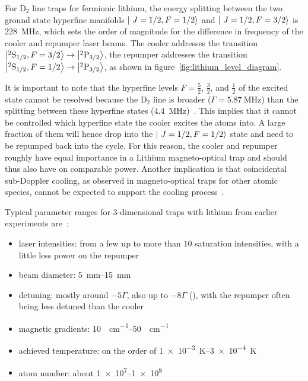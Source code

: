 For D$_2$ line traps for fermionic lithium, the energy splitting between the two ground state hyperfine manifolds $\Ket{~J=1/2, F=1/2}$ and $\Ket{~J=1/2, F=3/2}$ is \SI{228}{\mega\hertz}, which sets the order of magnitude for the difference in frequency of the cooler and repumper laser beams. The cooler addresses the transition $\Ket{^2\text{S}_{1/2}, F = 3/2} \rightarrow \Ket{^2\text{P}_{3/2}}$, the repumper addresses the transition $\Ket{^2\text{S}_{1/2}, F = 1/2} \rightarrow \Ket{^2\text{P}_{3/2}}$, as shown in figure~\ref{fig:lithium_level_diagram}.

It is important to note that the hyperfine levels $F = \frac{5}{2}$, $\frac{3}{2}$, and $\frac{1}{2}$ of the excited state cannot be resolved because the D$_2$ line is broader ($\Gamma = \SI[]{5.87}{\mega\hertz}$) than the splitting between these hyperfine states (\SI[]{4.4}{\mega\hertz})~\cite{gehm_properties_2003}. This implies that it cannot be controlled which hyperfine state the cooler excites the atoms into. A large fraction of them will hence drop into the $\Ket{~J=1/2, F=1/2}$ state and need to be repumped back into the cycle. For this reason, the cooler and repumper roughly have equal importance in a Lithium magneto-optical trap and should thus also have on comparable power. Another implication is that coincidental sub-Doppler cooling, as observed in magneto-optical traps for other atomic species, cannot be expected to support the cooling process~\cite{grier_lambda-enhanced_2013}.

Typical parameter ranges for 3-dimensional traps with lithium from earlier experiments are~\cite{
    tiecke_high-flux_2009,
    kawanaka_decay_1993,
    schunemann_magneto-optic_1998,
    mewes_simultaneous_1999,
    hilker_laser_2012,
    kerkmann_novel_2019,
    ladouceur_compact_2009,
    chen_lithium-cesium_2021,    
    burchianti_efficient_2014,
    li_enhanced_2015,
}:
\begin{itemize}
    \item laser intensities: from a few up to more than $10$ saturation intensities, with a little less power on the repumper
    \item beam diameter: \SIrange{5}{15}{\milli\meter}
    \item detuning: mostly around $-5\Gamma$, also up to $-8 \Gamma$ (\cite{li_enhanced_2015}), with the repumper often being less detuned than the cooler
    \item magnetic gradients: \SIrange{10}{50}{\gauss\per\centi\meter}
    \item achieved temperature: on the order of \SIrange{1e-3}{3e-4}{\kelvin}
    \item atom number: about \SIrange{1e7}{1e8}{}
\end{itemize}

